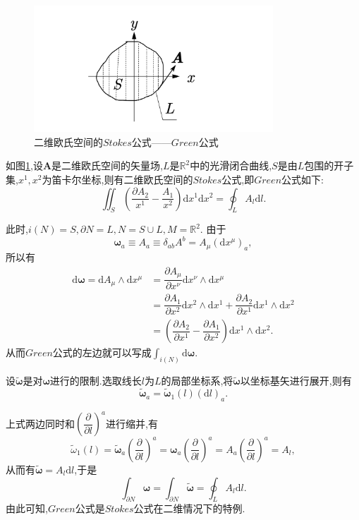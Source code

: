 \begin{remark}
\begin{figure}[htbp]
    \centering
 \includegraphics[width=0.8\textwidth]{img/5-4.png}
    \caption{二维欧氏空间的$Stokes$公式——$Green$公式}
    \label{fig:5-4}
\end{figure}
如图\ref{fig:5-4},设$\boldsymbol{A}$是二维欧氏空间的矢量场,$L$是$\mathbb{R}^2$中的光滑闭合曲线,$S$是由$L$包围的开子集,$x^1,x^2$为笛卡尔坐标,则有二维欧氏空间的$Stokes$公式,即$Green$公式如下:
$$
\iint_S\left(\dfrac{\partial A_2}{x^1}-\dfrac{A_1}{x^2}\right)\mathrm{d}x^1\mathrm{d}x^2=\oint_LA_l\mathrm{d}l.$$

此时,$i(N)=S,\partial N=L,N=S\cup L,M=\mathbb{R}^2.$
由于$$\boldsymbol{\omega}_a\equiv A_a\equiv \delta_{ab}A^b=A_\mu(\mathrm{d}x^\mu)_a,$$
所以有
$$
\begin{aligned}
\mathrm{d}\boldsymbol{\omega}=\mathrm{d}A_\mu\wedge\mathrm{d}x^\mu
&=\dfrac{\partial A_\mu}{\partial x^\nu}\mathrm{d}x^\nu\wedge \mathrm{d}x^\mu\\
&=\dfrac{\partial A_1}{\partial x^2}\mathrm{d}x^2\wedge \mathrm{d}x^1+\dfrac{\partial A_2}{\partial x^1}\mathrm{d}x^1\wedge \mathrm{d}x^2\\
&=\left(\dfrac{\partial A_2}{\partial x^1}-\dfrac{\partial A_1}{\partial x^2}\right)\mathrm{d}x^1\wedge \mathrm{d}x^2.
\end{aligned}
$$
从而$Green$公式的左边就可以写成$\displaystyle\int_{i(N)}\mathrm{d}\boldsymbol{\omega}.$

设$\tilde{\boldsymbol{\omega}}$是对$\boldsymbol{\omega}$进行的限制.选取线长$l$为$L$的局部坐标系,将$\tilde{\boldsymbol{\omega}}$以坐标基矢进行展开,则有
$$\tilde{\boldsymbol{\omega}}_a=\tilde{\boldsymbol{\omega}}_1(l)(\mathrm{d}l)_a.$$

上式两边同时和$\left(\dfrac{\partial}{\partial l}\right)^a$进行缩并,有
$$
\tilde{\omega}_1(l)=\tilde{\boldsymbol{\omega}}_a\left(\dfrac{\partial}{\partial l}\right)^a=\boldsymbol{\omega}_a\left(\dfrac{\partial}{\partial l}\right)^a=A_a\left(\dfrac{\partial}{\partial l}\right)^a=A_l,
$$
从而有$\tilde{\boldsymbol{\omega}}=A_l\mathrm{d}l$,于是
$$
\int_{\partial N}\boldsymbol{\omega}=\int_{\partial N}\tilde{\boldsymbol{\omega}}=\oint_{L}A_l\mathrm{d}l.
$$
由此可知,$Green$公式是$Stokes$公式在二维情况下的特例.
\end{remark}
\newpage
